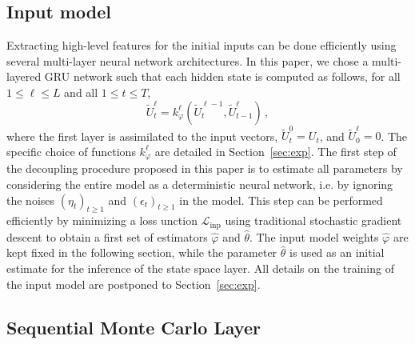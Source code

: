 \documentclass{article}
\begin{document}
\subsection{Input model}%
\label{sub:input_model}
Extracting high-level features for the initial inputs can be done efficiently using several multi-layer neural network architectures. In this paper, we chose a multi-layered GRU network such that each hidden state is computed as follows, for all $1 \leq \ell \leq L$ and all $1 \leq t \leq T$,
$$
	\tilde U^\ell_t = k_\varphi^\ell(\widetilde U^{\ell-1}_t, \widetilde U^\ell_{t-1})\,,
$$
where the first layer is assimilated to the input vectors, $\widetilde U_t^0 = U_t$, and $\widetilde U^\ell_0 = 0$. The specific choice of functions $ k_\varphi^\ell$ are detailed in Section~\ref{sec:exp}.
The first step of the decoupling procedure proposed in this paper is to estimate all parameters by considering the entire model as a deterministic neural network, i.e. by ignoring the noises $(\eta_t)_{t\geq 1}$ and $(\epsilon_t)_{t\geq 1}$ in the model.
This step can be performed efficiently by minimizing a loss unction $\mathcal{L}_{\mathrm{inp}}$ using traditional stochastic gradient descent to obtain a first set of estimators $\widehat \varphi$ and $ \widehat \theta$.
The input model weights $\widehat \varphi$ are kept fixed in the following section, while the parameter $\widehat \theta$ is used as an initial estimate for the inference of the state space layer.
All details on the training of the input model are postponed to Section~\ref{sec:exp}.

\subsection{Sequential Monte Carlo Layer}%
\label{sub:uncertainty_estimation}
\end{document}
